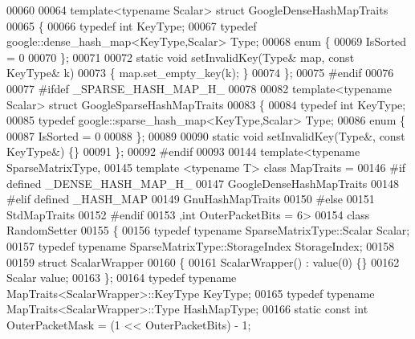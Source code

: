 \begin{DoxyCode}
00060 
00064 \textcolor{keyword}{template}<\textcolor{keyword}{typename} Scalar> \textcolor{keyword}{struct }GoogleDenseHashMapTraits
00065 \{
00066   \textcolor{keyword}{typedef} \textcolor{keywordtype}{int} KeyType;
00067   \textcolor{keyword}{typedef} google::dense\_hash\_map<KeyType,Scalar> Type;
00068   \textcolor{keyword}{enum} \{
00069     IsSorted = 0
00070   \};
00071 
00072   \textcolor{keyword}{static} \textcolor{keywordtype}{void} setInvalidKey(Type& map, \textcolor{keyword}{const} KeyType& k)
00073   \{ map.set\_empty\_key(k); \}
00074 \};
00075 \textcolor{preprocessor}{#endif}
00076 
00077 \textcolor{preprocessor}{#ifdef \_SPARSE\_HASH\_MAP\_H\_}
00078 
00082 \textcolor{keyword}{template}<\textcolor{keyword}{typename} Scalar> \textcolor{keyword}{struct }GoogleSparseHashMapTraits
00083 \{
00084   \textcolor{keyword}{typedef} \textcolor{keywordtype}{int} KeyType;
00085   \textcolor{keyword}{typedef} google::sparse\_hash\_map<KeyType,Scalar> Type;
00086   \textcolor{keyword}{enum} \{
00087     IsSorted = 0
00088   \};
00089 
00090   \textcolor{keyword}{static} \textcolor{keywordtype}{void} setInvalidKey(Type&, \textcolor{keyword}{const} KeyType&) \{\}
00091 \};
00092 \textcolor{preprocessor}{#endif}
00093 
00144 \textcolor{keyword}{template}<\textcolor{keyword}{typename} SparseMatrixType,
00145          \textcolor{keyword}{template} <\textcolor{keyword}{typename} T> \textcolor{keyword}{class }MapTraits =
00146 \textcolor{preprocessor}{#if defined \_DENSE\_HASH\_MAP\_H\_}
00147           GoogleDenseHashMapTraits
00148 \textcolor{preprocessor}{#elif defined \_HASH\_MAP}
00149           GnuHashMapTraits
00150 \textcolor{preprocessor}{#else}
00151           StdMapTraits
00152 \textcolor{preprocessor}{#endif}
00153          ,\textcolor{keywordtype}{int} OuterPacketBits = 6>
00154 \textcolor{keyword}{class }RandomSetter
00155 \{
00156     \textcolor{keyword}{typedef} \textcolor{keyword}{typename} SparseMatrixType::Scalar Scalar;
00157     \textcolor{keyword}{typedef} \textcolor{keyword}{typename} SparseMatrixType::StorageIndex StorageIndex;
00158 
00159     \textcolor{keyword}{struct }ScalarWrapper
00160     \{
00161       ScalarWrapper() : value(0) \{\}
00162       Scalar value;
00163     \};
00164     \textcolor{keyword}{typedef} \textcolor{keyword}{typename} MapTraits<ScalarWrapper>::KeyType KeyType;
00165     \textcolor{keyword}{typedef} \textcolor{keyword}{typename} MapTraits<ScalarWrapper>::Type HashMapType;
00166     \textcolor{keyword}{static} \textcolor{keyword}{const} \textcolor{keywordtype}{int} OuterPacketMask = (1 << OuterPacketBits) - 1;

\end{DoxyCode}
